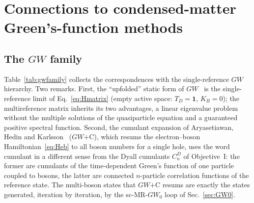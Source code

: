 \documentclass[11pt,a4paper]{article}
\newcommand{\GW}{$GW$}
\begin{document}
\section{Connections to condensed-matter Green's-function methods}
\label{sec:cm}

\subsection{The \GW{} family}

Table~\ref{tab:gwfamily} collects the correspondences with the
single-reference \GW{} hierarchy.  Two remarks.  First, the ``upfolded''
static form of \GW{}~\cite{BintrimBerkelbach2021,LangeBerkelbach2018,TolleChan2023}
is the single-reference limit of Eq.~\eqref{eq:Hmatrix} (empty active space:
$T_D=\mathbf 1$, $K_B=0$); the multireference matrix inherits its two
advantages, a linear eigenvalue problem without the multiple solutions of the
quasiparticle equation and a guaranteed positive spectral function.  Second,
the cumulant expansion of Aryasetiawan, Hedin and
Karlsson~\cite{Aryasetiawan1996} (\GW{}$+$C), which resums the electron--boson
Hamiltonian~\eqref{eq:Heb} to all boson numbers for a single hole, uses the
word cumulant in a different sense from the Dyall cumulants $C_n^D$ of
Objective~I: the former are cumulants of the time-dependent Green's function
of one particle coupled to bosons, the latter are connected $n$-particle
correlation functions of the reference state.  The multi-boson states that
\GW{}$+$C resums are exactly the states generated, iteration by iteration, by
the sc-MR-$GW_0$ loop of Sec.~\ref{sec:GW0}.
\end{document}
